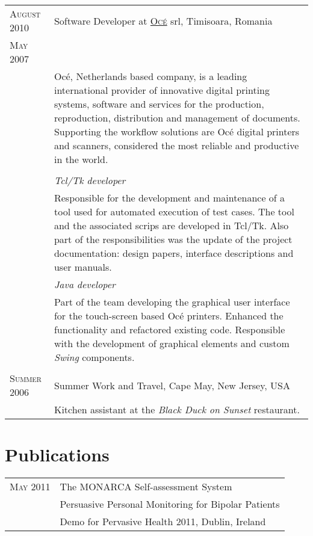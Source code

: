 \documentclass[a4paper,10pt]{article}
\begin{document}
\begin{tabular}{p{2.5cm}|p{11cm}}
 \raggedleft \textsc{August 2010} & Software Developer at \textsc{\href{http://www3.oce.com/ro/}{Oc\'e}} srl, Timisoara, Romania
 \\\raggedleft \textsc{May 2007}\\& 
 \footnotesize{Oc\'e, Netherlands based company, is a leading international
 provider of innovative digital printing systems, software
 and services for the production, reproduction, distribution and management of
 documents. Supporting the workflow solutions are Oc\'e digital  printers and
 scanners, considered the most reliable and productive in the world.}\\ \\ 
 &\emph{Tcl/Tk developer}\\
 &\footnotesize{Responsible for the development and maintenance of a tool
 used for automated execution of test cases. The tool and the associated scrips
 are developed in Tcl/Tk. Also part of the responsibilities was the update of
 the project documentation: design papers, interface descriptions and user
 manuals.}\\ 
 &\emph{Java developer}\\&\footnotesize{Part of the team developing the 
 graphical user interface for the touch-screen based Oc\'e printers. Enhanced
 the functionality and refactored existing code. Responsible with the development
 of graphical elements and custom \emph{Swing} components.} 
 \\\multicolumn{2}{c}{} \\ 
 \raggedleft \textsc{Summer 2006} & Summer Work and Travel, Cape May, New
 Jersey, USA\\&\footnotesize{Kitchen assistant at the \emph{Black Duck on Sunset} restaurant.}
\end{tabular}

\section{Publications}
\begin{tabular}{p{2.5cm}|p{11cm}}

 \raggedleft \textsc{May 2011} & The MONARCA Self-assessment System \\
 & Persuasive Personal Monitoring for Bipolar Patients \\
 & \footnotesize{Demo for Pervasive Health 2011, Dublin, Ireland}
\end{tabular}

\end{document}
